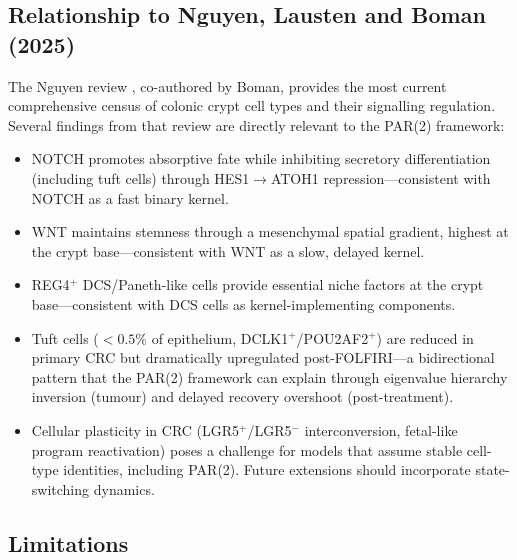 \documentclass[11pt,letterpaper]{article}
\theoremstyle{definition}
\theoremstyle{remark}
\begin{document}
\subsection{Relationship to Nguyen, Lausten and Boman (2025)}

The Nguyen review \citep{nguyen2025colonic}, co-authored by Boman, provides the most current comprehensive census of colonic crypt cell types and their signalling regulation. Several findings from that review are directly relevant to the PAR(2) framework:
\begin{itemize}
\item NOTCH promotes absorptive fate while inhibiting secretory differentiation (including tuft cells) through HES1$\to$ATOH1 repression---consistent with NOTCH as a fast binary kernel.
\item WNT maintains stemness through a mesenchymal spatial gradient, highest at the crypt base---consistent with WNT as a slow, delayed kernel.
\item REG4$^+$ DCS/Paneth-like cells provide essential niche factors at the crypt base---consistent with DCS cells as kernel-implementing components.
\item Tuft cells ($<0.5\%$ of epithelium, DCLK1$^+$/POU2AF2$^+$) are reduced in primary CRC but dramatically upregulated post-FOLFIRI---a bidirectional pattern that the PAR(2) framework can explain through eigenvalue hierarchy inversion (tumour) and delayed recovery overshoot (post-treatment).
\item Cellular plasticity in CRC (LGR5$^+$/LGR5$^-$ interconversion, fetal-like program reactivation) poses a challenge for models that assume stable cell-type identities, including PAR(2). Future extensions should incorporate state-switching dynamics.
\end{itemize}

\subsection{Limitations}
\end{document}
